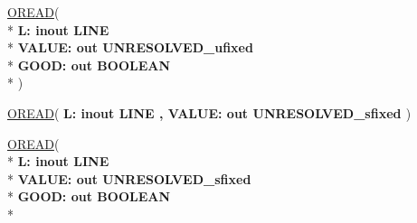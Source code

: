 \begin{DoxyCompactItemize}
\item 
{\bfseries {\bfseries \textcolor{vhdlchar}{ }}} \hyperlink{class__fixed__pkg_a9ed16f2e9095995d98073cf26843bf3e}{O\+R\+E\+A\+D}( \\*
{\bfseries \textcolor{vhdlchar}{ }\textcolor{vhdlchar}{L\+: }\textcolor{stringliteral}{} {\bfseries \textcolor{keywordflow}{inout}\textcolor{vhdlchar}{ }\textcolor{vhdlchar}{L\+I\+N\+E}\textcolor{vhdlchar}{ }}}\\*
  {\bfseries \textcolor{vhdlchar}{ }\textcolor{vhdlchar}{V\+A\+L\+U\+E\+: }\textcolor{stringliteral}{} {\bfseries \textcolor{keywordflow}{out}\textcolor{vhdlchar}{ }\textcolor{vhdlchar}{U\+N\+R\+E\+S\+O\+L\+V\+E\+D\+\_\+ufixed}\textcolor{vhdlchar}{ }}}\\*
  {\bfseries \textcolor{vhdlchar}{ }\textcolor{vhdlchar}{G\+O\+O\+D\+: }\textcolor{stringliteral}{} {\bfseries \textcolor{keywordflow}{out}\textcolor{vhdlchar}{ }\textcolor{comment}{B\+O\+O\+L\+E\+A\+N}\textcolor{vhdlchar}{ }}}\\*
   )
\item 
{\bfseries {\bfseries \textcolor{vhdlchar}{ }}} \hyperlink{class__fixed__pkg_aee7eef038bb2e610868a9cb8c0c14497}{O\+R\+E\+A\+D}( {\bfseries \textcolor{vhdlchar}{ }\textcolor{vhdlchar}{L\+: }\textcolor{stringliteral}{} {\bfseries \textcolor{keywordflow}{inout}\textcolor{vhdlchar}{ }\textcolor{vhdlchar}{L\+I\+N\+E}\textcolor{vhdlchar}{ }}}{\bfseries ,\textcolor{vhdlchar}{ }\textcolor{vhdlchar}{V\+A\+L\+U\+E\+: }\textcolor{stringliteral}{} {\bfseries \textcolor{keywordflow}{out}\textcolor{vhdlchar}{ }\textcolor{vhdlchar}{U\+N\+R\+E\+S\+O\+L\+V\+E\+D\+\_\+sfixed}\textcolor{vhdlchar}{ }}} )
\item 
{\bfseries {\bfseries \textcolor{vhdlchar}{ }}} \hyperlink{class__fixed__pkg_a9ed16f2e9095995d98073cf26843bf3e}{O\+R\+E\+A\+D}( \\*
{\bfseries \textcolor{vhdlchar}{ }\textcolor{vhdlchar}{L\+: }\textcolor{stringliteral}{} {\bfseries \textcolor{keywordflow}{inout}\textcolor{vhdlchar}{ }\textcolor{vhdlchar}{L\+I\+N\+E}\textcolor{vhdlchar}{ }}}\\*
  {\bfseries \textcolor{vhdlchar}{ }\textcolor{vhdlchar}{V\+A\+L\+U\+E\+: }\textcolor{stringliteral}{} {\bfseries \textcolor{keywordflow}{out}\textcolor{vhdlchar}{ }\textcolor{vhdlchar}{U\+N\+R\+E\+S\+O\+L\+V\+E\+D\+\_\+sfixed}\textcolor{vhdlchar}{ }}}\\*
  {\bfseries \textcolor{vhdlchar}{ }\textcolor{vhdlchar}{G\+O\+O\+D\+: }\textcolor{stringliteral}{} {\bfseries \textcolor{keywordflow}{out}\textcolor{vhdlchar}{ }\textcolor{comment}{B\+O\+O\+L\+E\+A\+N}\textcolor{vhdlchar}{ }}}\\*

\end{DoxyCompactItemize}
